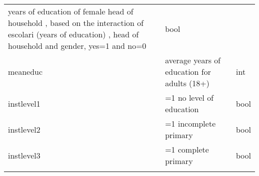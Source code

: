 \documentclass[11pt]{article}
\begin{document}
\begin{longtable}[]{@{}lll@{}}
\begin{minipage}[t]{0.16\columnwidth}
years of education of female head of household , based on the
interaction of escolari (years of education) , head of household and
gender, yes=1 and no=0\strut
\end{minipage} & \begin{minipage}[t]{0.24\columnwidth}\raggedright\strut
bool\strut
\end{minipage}\tabularnewline
\begin{minipage}[t]{0.19\columnwidth}\raggedright\strut
meaneduc\strut
\end{minipage} & \begin{minipage}[t]{0.16\columnwidth}\raggedright\strut
average years of education for adults (18+)\strut
\end{minipage} & \begin{minipage}[t]{0.24\columnwidth}\raggedright\strut
int\strut
\end{minipage}\tabularnewline
\begin{minipage}[t]{0.19\columnwidth}\raggedright\strut
instlevel1\strut
\end{minipage} & \begin{minipage}[t]{0.16\columnwidth}\raggedright\strut
=1 no level of education\strut
\end{minipage} & \begin{minipage}[t]{0.24\columnwidth}\raggedright\strut
bool\strut
\end{minipage}\tabularnewline
\begin{minipage}[t]{0.19\columnwidth}\raggedright\strut
instlevel2\strut
\end{minipage} & \begin{minipage}[t]{0.16\columnwidth}\raggedright\strut
=1 incomplete primary\strut
\end{minipage} & \begin{minipage}[t]{0.24\columnwidth}\raggedright\strut
bool\strut
\end{minipage}\tabularnewline
\begin{minipage}[t]{0.19\columnwidth}\raggedright\strut
instlevel3\strut
\end{minipage} & \begin{minipage}[t]{0.16\columnwidth}\raggedright\strut
=1 complete primary\strut
\end{minipage} & \begin{minipage}[t]{0.24\columnwidth}\raggedright\strut
bool\strut
\end{minipage}\tabularnewline
\begin{minipage}[t]{0.19\columnwidth}\raggedright\strut

\end{minipage}
\end{longtable}
\end{document}
